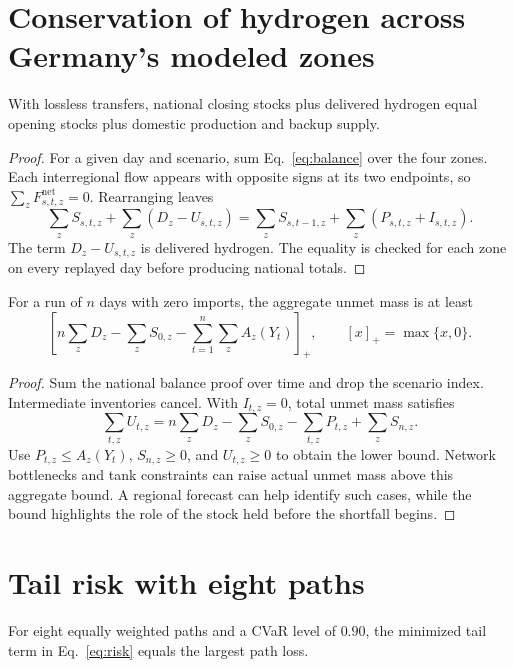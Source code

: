 \section{Conservation of hydrogen across Germany's modeled zones}
\label{app:mass}

\begin{proposition}
With lossless transfers, national closing stocks plus delivered hydrogen equal opening stocks plus domestic production and backup supply.
\end{proposition}

\begin{proof}
For a given day and scenario, sum Eq.~\eqref{eq:balance} over the four zones. Each interregional flow appears with opposite signs at its two endpoints, so $\sum_z F^{\mathrm{net}}_{s,t,z}=0$. Rearranging leaves
\[
\sum_z S_{s,t,z}+\sum_z(D_z-U_{s,t,z})
=\sum_z S_{s,t-1,z}+\sum_z(P_{s,t,z}+I_{s,t,z}).
\]
The term $D_z-U_{s,t,z}$ is delivered hydrogen. The equality is checked for each zone on every replayed day before producing national totals.
\end{proof}

\begin{proposition}
For a run of $n$ days with zero imports, the aggregate unmet mass is at least
\[
\left[n\sum_z D_z-\sum_z S_{0,z}-
      \sum_{t=1}^{n}\sum_z A_z(Y_t)\right]_+,\qquad [x]_+=\max\{x,0\}.
\]
\end{proposition}

\begin{proof}
Sum the national balance proof over time and drop the scenario index. Intermediate inventories cancel. With $I_{t,z}=0$, total unmet mass satisfies
\[
\sum_{t,z}U_{t,z}= n\sum_zD_z-\sum_z S_{0,z}
                  -\sum_{t,z}P_{t,z}+\sum_z S_{n,z}.
\]
Use $P_{t,z}\le A_z(Y_t)$, $S_{n,z}\ge0$, and $U_{t,z}\ge0$ to obtain the lower bound. Network bottlenecks and tank constraints can raise actual unmet mass above this aggregate bound. A regional forecast can help identify such cases, while the bound highlights the role of the stock held before the shortfall begins.
\end{proof}

\section{Tail risk with eight paths}
\label{app:cvar}

\begin{proposition}
For eight equally weighted paths and a CVaR level of $0.90$, the minimized tail term in Eq.~\eqref{eq:risk} equals the largest path loss.
\end{proposition}

